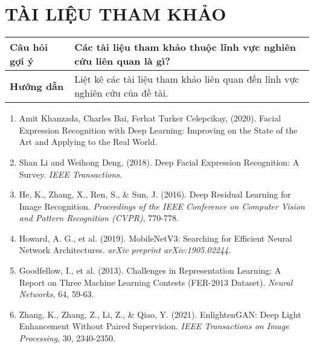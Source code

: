 \section*{TÀI LIỆU THAM KHẢO}

\begin{tabular}{|p{4cm}|p{11cm}|}
    \hline
    \textbf{Câu hỏi gợi ý} & Các tài liệu tham khảo thuộc lĩnh vực nghiên cứu liên quan là gì? \\
    \hline
    \textbf{Hướng dẫn} & Liệt kê các tài liệu tham khảo liên quan đến lĩnh vực nghiên cứu của đề tài. \\
    \hline
\end{tabular}

\medskip

\begin{enumerate}
    \item Amit Khanzada, Charles Bai, Ferhat Turker Celepcikay, (2020). Facial Expression Recognition with Deep Learning: Improving on the State of the Art and Applying to the Real World.
    \item Shan Li and Weihong Deng, (2018). Deep Facial Expression Recognition: A Survey. \textit{IEEE Transactions}.
    \item He, K., Zhang, X., Ren, S., \& Sun, J. (2016). Deep Residual Learning for Image Recognition. \textit{Proceedings of the IEEE Conference on Computer Vision and Pattern Recognition (CVPR)}, 770-778.
    \item Howard, A. G., et al. (2019). MobileNetV3: Searching for Efficient Neural Network Architectures. \textit{arXiv preprint arXiv:1905.02244}.
    \item Goodfellow, I., et al. (2013). Challenges in Representation Learning: A Report on Three Machine Learning Contests (FER-2013 Dataset). \textit{Neural Networks}, 64, 59-63.
    \item Zhang, K., Zhang, Z., Li, Z., \& Qiao, Y. (2021). EnlightenGAN: Deep Light Enhancement Without Paired Supervision. \textit{IEEE Transactions on Image Processing}, 30, 2340-2350.
\end{enumerate}